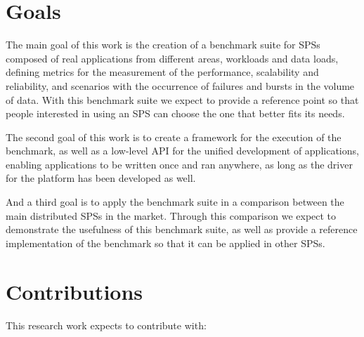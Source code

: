 \documentclass[ppgc,diss,english]{iiufrgs}
\begin{document}
\section{Goals}

The main goal of this work is the creation of a benchmark suite for SPSs composed of real applications from different areas, workloads and data loads, defining metrics for the measurement of the performance, scalability and reliability, and scenarios with the occurrence of failures and bursts in the volume of data. With this benchmark suite we expect to provide a reference point so that people interested in using an SPS can choose the one that better fits its needs.

The second goal of this work is to create a framework for the execution of the benchmark, as well as a low-level API for the unified development of applications, enabling applications to be written once and ran anywhere, as long as the driver for the platform has been developed as well.

And a third goal is to apply the benchmark suite in a comparison between the main distributed SPSs in the market. Through this comparison we expect to demonstrate the usefulness of this benchmark suite, as well as provide a reference implementation of the benchmark so that it can be applied in other SPSs.

\section{Contributions}

This research work expects to contribute with:
\end{document}
